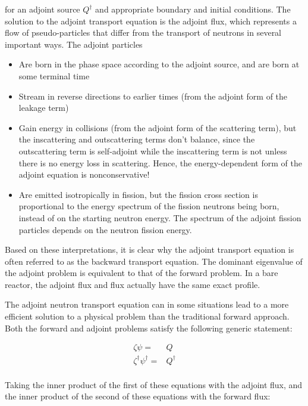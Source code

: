 \documentclass[10pt]{article}
\begin{document}
\begin{flushleft}
for an adjoint source \(Q^\dagger\) and appropriate boundary and initial conditions. The solution to the adjoint transport equation is the adjoint flux, which represents a flow of pseudo-particles that differ from the transport of neutrons in several important ways. The adjoint particles

\begin{itemize}
\item Are born in the phase space according to the adjoint source, and are born at some terminal time
\item Stream in reverse directions to earlier times (from the adjoint form of the leakage term)
\item Gain energy in collisions (from the adjoint form of the scattering term), but the inscattering and outscattering terms don't balance, since the outscattering term is self-adjoint while the inscattering term is not unless there is no energy loss in scattering. Hence, the energy-dependent form of the adjoint equation is nonconservative!
\item Are emitted isotropically in fission, but the fission cross section is proportional to the energy spectrum of the fission neutrons being born, instead of on the starting neutron energy. The spectrum of the adjoint fission particles depends on the neutron fission energy.
\end{itemize}

Based on these interpretations, it is clear why the adjoint transport equation is often referred to as the backward transport equation. The dominant eigenvalue of the adjoint problem is equivalent to that of the forward problem. In a bare reactor, the adjoint flux and flux actually have the same exact profile. 

The adjoint neutron transport equation can in some situations lead to a more efficient solution to a physical problem than the traditional forward approach. Both the forward and adjoint problems satisfy the following generic statement:

\begin{equation}
\begin{aligned}
\zeta\psi=& Q\\
\zeta^\dagger\psi^\dagger=& Q^\dagger\\
\end{aligned}
\end{equation}

Taking the inner product of the first of these equations with the adjoint flux, and the inner product of the second of these equations with the forward flux:


\end{flushleft}
\end{document}
